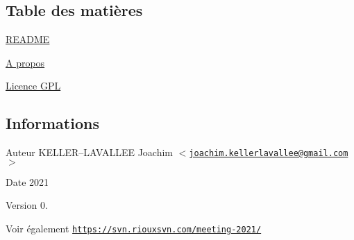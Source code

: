 \hypertarget{index_section_tdm}{}\subsection{Table des matières}\label{index_section_tdm}

\begin{DoxyItemize}
\item \hyperlink{page__r_e_a_d_m_e}{R\+E\+A\+D\+ME}
\item \hyperlink{page_about}{A propos}
\item \hyperlink{page_licence}{Licence G\+PL}
\end{DoxyItemize}\hypertarget{index_section_infos}{}\subsection{Informations}\label{index_section_infos}
\begin{DoxyAuthor}{Auteur}
K\+E\+L\+L\+ER--L\+A\+V\+A\+L\+L\+EE Joachim $<$\href{mailto:joachim.kellerlavallee@gmail.com}{\tt joachim.\+kellerlavallee@gmail.\+com}$>$ 
\end{DoxyAuthor}
\begin{DoxyDate}{Date}
2021 
\end{DoxyDate}
\begin{DoxyVersion}{Version}
0. 
\end{DoxyVersion}
\begin{DoxySeeAlso}{Voir également}
\href{https://svn.riouxsvn.com/meeting-2021/}{\tt https\+://svn.\+riouxsvn.\+com/meeting-\/2021/} 
\end{DoxySeeAlso}
